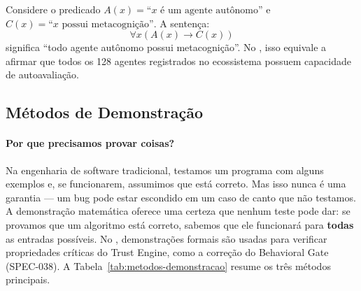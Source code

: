 \begin{exemplo}
    Considere o predicado $A(x) = \text{``}x\text{ é um agente autônomo''}$ e
    $C(x) = \text{``}x\text{ possui metacognição''}$. A sentença:
    \[
    \forall x (A(x) \to C(x))
    \]
    significa ``todo agente autônomo possui metacognição''. No \opencodeeco,
    isso equivale a afirmar que todos os 128 agentes registrados no
    ecossistema possuem capacidade de autoavaliação.
\end{exemplo}

\subsection{Métodos de Demonstração}

\paragraph{Por que precisamos provar coisas?} Na engenharia de software
tradicional, testamos um programa com alguns exemplos e, se funcionarem,
assumimos que está correto. Mas isso nunca é uma garantia --- um bug pode
estar escondido em um caso de canto que não testamos. A demonstração
matemática oferece uma certeza que nenhum teste pode dar: se provamos que um
algoritmo está correto, sabemos que ele funcionará para \textbf{todas} as
entradas possíveis. No \opencodeeco{}, demonstrações formais são usadas para
verificar propriedades críticas do Trust Engine, como a correção do
Behavioral Gate (SPEC-038). A Tabela~\ref{tab:metodos-demonstracao} resume
os três métodos principais.

\begin{table}[htb]
    \centering
    \small
    \caption{Métodos de demonstração: quando usar cada um}
\end{table}

